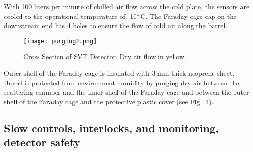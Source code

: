 With 100 liters per minute of chilled air flow across the cold plate, the sensors are cooled to the operational temperature of -10$\degree$C. The Faraday cage cap on the downstream end has 4 holes to ensure the flow of cold air along the barrel. 

\begin{figure}[hbt] 
\centering 
\texttt{[image: purging2.png]}
\caption{Cross Section of SVT Detector.  Dry air flow in yellow.}
\label{fig:purging2}
\end{figure}

Outer shell of the Faraday cage is insulated with 3 mm thick neoprene sheet. Barrel is protected from environment humidity by purging dry air between the scattering chamber and the inner shell of the Faraday cage and between the outer shell of the Faraday cage and the protective plastic cover (see Fig.~\ref{fig:purging2}). 

\subsection{Slow controls, interlocks, and monitoring, detector safety}

